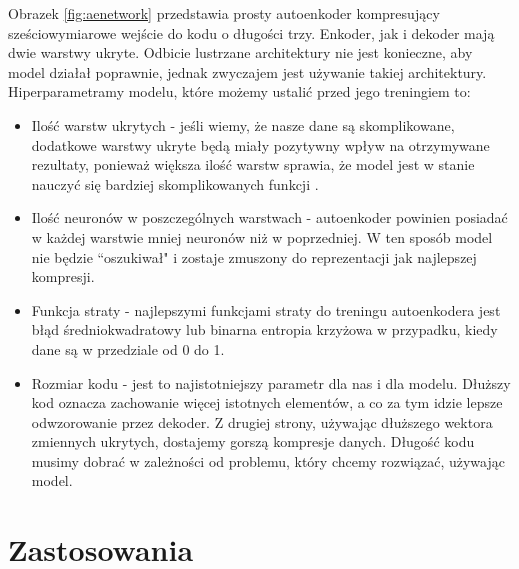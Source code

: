 \documentclass[a4paper,12pt,oneside]{book} %
\begin{document}
Obrazek \ref{fig:aenetwork} przedstawia prosty autoenkoder kompresujący sześciowymiarowe wejście do kodu o długości trzy. Enkoder, jak i dekoder mają dwie warstwy ukryte. Odbicie lustrzane architektury nie jest konieczne, aby model działał poprawnie, jednak zwyczajem jest używanie takiej architektury.\\
Hiperparametramy modelu, które możemy ustalić przed jego treningiem to:
\begin{itemize}
	\item Ilość warstw ukrytych - jeśli wiemy, że nasze dane są skomplikowane, dodatkowe warstwy ukryte będą miały pozytywny wpływ na otrzymywane rezultaty, ponieważ większa ilość warstw sprawia, że model jest w stanie nauczyć się bardziej skomplikowanych funkcji \cite{telgarsky2016benefits, eldan2016power}.
	\item Ilość neuronów w poszczególnych warstwach - autoenkoder powinien posiadać w każdej warstwie mniej neuronów niż w poprzedniej. W ten sposób model nie będzie ``oszukiwał" i zostaje zmuszony do reprezentacji jak najlepszej kompresji.
	\item Funkcja straty - najlepszymi funkcjami straty do treningu autoenkodera jest błąd średniokwadratowy lub binarna entropia krzyżowa w przypadku, kiedy dane są w przedziale od 0 do 1.
	\item Rozmiar kodu - jest to najistotniejszy parametr dla nas i dla modelu. Dłuższy kod oznacza zachowanie więcej istotnych elementów, a co za tym idzie lepsze odwzorowanie przez dekoder. Z drugiej strony, używając dłuższego wektora zmiennych ukrytych, dostajemy gorszą kompresje danych. Długość kodu musimy dobrać w zależności od problemu, który chcemy rozwiązać, używając model.
\end{itemize}
\section{Zastosowania}
\end{document}
